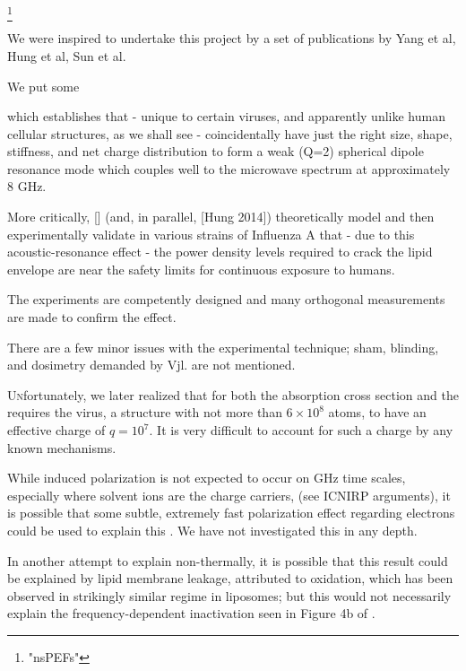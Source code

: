 \documentclass[paper.tex]{subfiles}
\begin{document}
\begin{multicols}{1}
\footnote{"nsPEFs"}



We were inspired to undertake this project by a set of publications by Yang et al, Hung et al, Sun et al.

We put some

which establishes that - unique to certain viruses, and apparently unlike human cellular structures, as we shall see - coincidentally have just the right size, shape, stiffness, and net charge distribution to form a weak (Q=2) spherical dipole resonance mode which couples well to the microwave spectrum at approximately 8 GHz.

More critically, [] (and, in parallel, [Hung 2014]) theoretically model and then experimentally validate in various strains of Influenza A that - due to this acoustic-resonance effect - the power density levels required to crack the lipid envelope are near the safety limits for continuous exposure to humans.

The experiments are competently designed and many orthogonal measurements are made to confirm the effect.

There are a few minor issues with the experimental technique; sham, blinding, and dosimetry demanded by Vjl. are not mentioned.

\lettrine{U}nfortunately, we later realized that for both the absorption cross section and the requires the virus, a structure with not more than $6 \times 10^8$ atoms, to have an effective charge of $q=10^7$. It is very difficult to account for such a charge by any known mechanisms. 




While induced polarization is not expected to occur on GHz time scales, especially where solvent ions are the charge carriers, (see ICNIRP arguments), it is possible that some subtle, extremely fast polarization effect regarding electrons could be used to explain this \cite{nature1986}. We have not investigated this in any depth.

In another attempt to explain non-thermally, it is possible that this result could be explained by lipid membrane leakage, attributed to oxidation, which has been observed in strikingly similar regime in liposomes; but this would not necessarily explain the frequency-dependent inactivation seen in Figure 4b of \cite{Efficient2015}.


\end{multicols}
\end{document}
